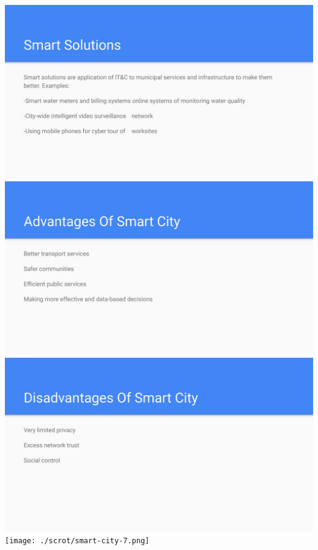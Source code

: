\documentclass[17pt,a4paper,oneside,margin=1in]{article}
\begin{document}
\begin{center}
	\includegraphics[width=0.7\linewidth]{./scrot/smart-city-4.png}
	\includegraphics[width=0.7\linewidth]{./scrot/smart-city-5.png}
	\includegraphics[width=0.7\linewidth]{./scrot/smart-city-6.png}
	\texttt{[image: ./scrot/smart-city-7.png]}
\end{center}
\end{document}
